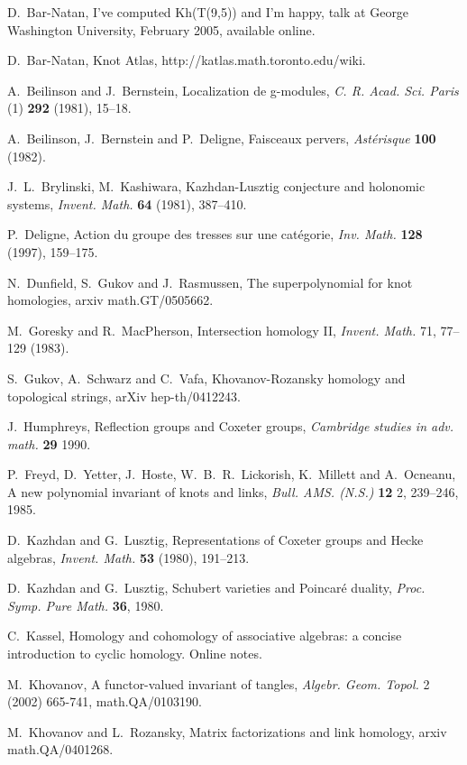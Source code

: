 \documentclass[12pt]{article}
\begin{document}
\noindent 
[BN2] D.~Bar-Natan,  I've computed Kh(T(9,5)) and I'm happy, 
talk at George Washington University, February 2005, available online. 

\noindent
[BN3] D.~Bar-Natan, Knot Atlas, http://katlas.math.toronto.edu/wiki. 

\noindent 
[BB] A.~Beilinson and J.~Bernstein, Localization de g-modules, \emph{C. R. 
Acad. Sci. Paris} (1) {\bf 292} (1981), 15--18.

\noindent
[BBD] A.~Beilinson, J.~Bernstein and P.~Deligne, Faisceaux 
pervers, \emph{Ast\'erisque} {\bf 100} (1982). 

\noindent 
[BK] J.~L.~Brylinski, M.~Kashiwara, Kazhdan-Lusztig conjecture 
and holonomic systems, \emph{Invent. Math.} {\bf 64} (1981), 387--410. 

\noindent
[D] P.~Deligne, Action du groupe des tresses sur une cat\'egorie, 
\emph{Inv. Math.} {\bf 128} (1997), 159--175. 

\noindent 
[DGR] N.~Dunfield, S.~Gukov and J.~Rasmussen, The superpolynomial for 
knot homologies, arxiv math.GT/0505662. 

\noindent
[GM] M.~Goresky and R.~MacPherson, Intersection homology II, 
\emph{Invent. Math.} 71, 77--129 (1983). 

\noindent
[GSV] S.~Gukov, A.~Schwarz and C.~Vafa, Khovanov-Rozansky homology 
and topological strings, arXiv hep-th/0412243. 

\noindent
[H] J.~Humphreys, Reflection groups and Coxeter groups, 
\emph{Cambridge studies in adv. math.} {\bf 29} 1990. 

\noindent 
[HOMFLY] P.~Freyd, D.~Yetter, J.~Hoste, W.~B.~R.~Lickorish, 
K.~Millett and A.~Ocneanu, A new polynomial invariant of knots 
and links, \emph{Bull. AMS. (N.S.)} {\bf 12} 2, 239--246, 1985. 

\noindent 
[KL1] D.~Kazhdan and G.~Lusztig, Representations of Coxeter groups 
and Hecke algebras, \emph{Invent. Math.} {\bf 53} (1980), 191--213. 

\noindent
[KL2] D.~Kazhdan and G.~Lusztig, Schubert varieties and Poincar\'e 
duality, \emph{Proc. Symp. Pure Math.} {\bf 36}, 1980.  

\noindent
[Ka] C.~Kassel, Homology and cohomology of associative 
algebras: a concise introduction to cyclic homology. Online notes. 

\noindent
[K] M.~Khovanov, A functor-valued invariant of tangles,
\emph{Algebr. Geom. Topol.} 2 (2002) 665-741,  math.QA/0103190. 

\noindent
[KR1] M.~Khovanov and L.~Rozansky, Matrix factorizations and
link homology, arxiv math.QA/0401268. 
\end{document}
